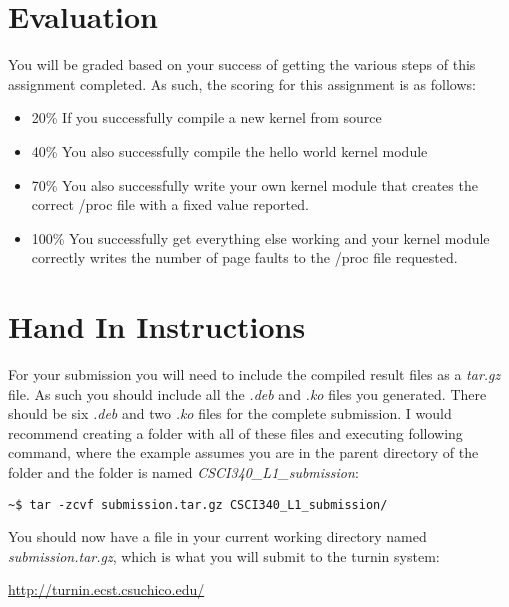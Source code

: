\documentclass[11pt]{article}
\begin{document}
\section*{Evaluation}

You will be graded based on your success of getting the various steps of this assignment completed. As such, the scoring for this assignment is as follows:

\begin{itemize}
\item 20\% If you successfully compile a new kernel from source
\item 40\% You also successfully compile the hello world kernel module
\item 70\% You also successfully write your own kernel module that creates the correct /proc file with a fixed value reported.
\item 100\% You successfully get everything else working and your kernel module correctly writes the number of page faults to the /proc file requested. 
\end{itemize}


\section*{Hand In Instructions}

For your submission you will need to include the compiled result files as a \emph{tar.gz} file. As such you should include all the \emph{.deb} and \emph{.ko} files you generated. There should be six \emph{.deb} and two \emph{.ko} files for the complete submission. I would recommend creating a folder with all of these files and executing following command, where the example assumes you are in the parent directory of the folder and the folder is named \emph{CSCI340\_L1\_submission}:

\begin{verbatim}
~$ tar -zcvf submission.tar.gz CSCI340_L1_submission/
\end{verbatim}

You should now have a file in your current working directory named \emph{submission.tar.gz}, which is what you will submit to the turnin system:

\url{http://turnin.ecst.csuchico.edu/}
\end{document}
